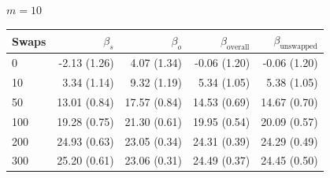 \begin{table}[H]
\begin{tabular}{l rrrr}
\bottomrule
\end{tabular}
\par\medskip
\noindent\textit{$m = 10$}\\[2pt]
\begin{tabular}{l rrrr}
\toprule
Swaps & $\beta_s$ & $\beta_o$ & $\beta_{\mathrm{overall}}$ & $\beta_{\mathrm{unswapped}}$ \\
\midrule
0 & -2.13 (1.26) & 4.07 (1.34) & -0.06 (1.20) & -0.06 (1.20) \\
10 & 3.34 (1.14) & 9.32 (1.19) & 5.34 (1.05) & 5.38 (1.05) \\
50 & 13.01 (0.84) & 17.57 (0.84) & 14.53 (0.69) & 14.67 (0.70) \\
100 & 19.28 (0.75) & 21.30 (0.61) & 19.95 (0.54) & 20.09 (0.57) \\
200 & 24.93 (0.63) & 23.05 (0.34) & 24.31 (0.39) & 24.29 (0.49) \\
300 & 25.20 (0.61) & 23.06 (0.31) & 24.49 (0.37) & 24.45 (0.50) \\
\bottomrule
\end{tabular}
\end{table}

